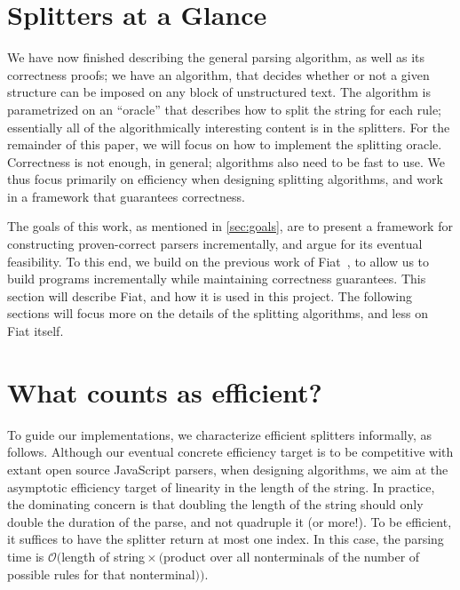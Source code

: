 \section{Splitters at a Glance}
  We have now finished describing the general parsing algorithm, as well as its correctness proofs; we have an algorithm, that decides whether or not a given structure can be imposed on any block of unstructured text.  The algorithm is parametrized on an ``oracle'' that describes how to split the string for each rule; essentially all of the algorithmically interesting content is in the splitters.  For the remainder of this paper, we will focus on how to implement the splitting oracle.  Correctness is not enough, in general; algorithms also need to be fast to use.  We thus focus primarily on efficiency when designing splitting algorithms, and work in a framework that guarantees correctness.
  
  The goals of this work, as mentioned in \autoref{sec:goals}, are to present a framework for constructing proven-correct parsers incrementally, and argue for its eventual feasibility.  To this end, we build on the previous work of Fiat~\cite{fiat}, to allow us to build programs incrementally while maintaining correctness guarantees.  This section will describe Fiat, and how it is used in this project.  The following sections will focus more on the details of the splitting algorithms, and less on Fiat itself.
  
\section{What counts as efficient?}
  To guide our implementations, we characterize efficient splitters informally, as follows.  Although our eventual concrete efficiency target is to be competitive with extant open source JavaScript parsers, when designing algorithms, we aim at the asymptotic efficiency target of linearity in the length of the string.  In practice, the dominating concern is that doubling the length of the string should only double the duration of the parse, and not quadruple it (or more!).  {}  To be efficient, it suffices to have the splitter return at most one index.  In this case, the parsing time is $\mathcal O($length of string${} \times ($product over all nonterminals of the number of possible rules for that nonterminal$))$.
    

